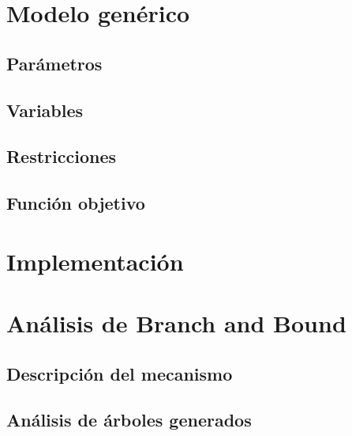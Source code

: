 




\maketitle


\tableofcontents

\clearpage



\section{Modelo genérico}

\subsection{Parámetros}

\subsection{Variables}

\subsection{Restricciones}

\subsection{Función objetivo}

\section{Implementación}

\section{Análisis de Branch and Bound}

\subsection{Descripción del mecanismo}

\subsection{Análisis de árboles generados}

